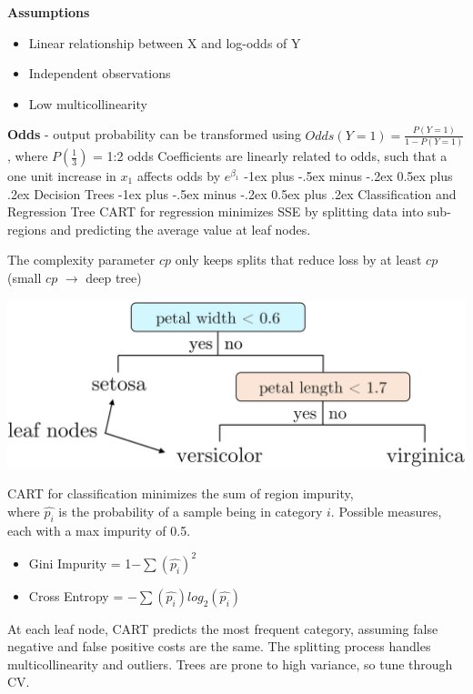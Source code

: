 \documentclass[10pt,landscape]{article}
\makeatletter
\renewcommand{\section}{\@startsection{section}{1}{0mm}%
                                {-1ex plus -.5ex minus -.2ex}%
                                {0.5ex plus .2ex}%
                                {\normalfont\large\bfseries}}
\renewcommand{\subsection}{\@startsection{subsection}{2}{0mm}%
                                {-1ex plus -.5ex minus -.2ex}%
                                {0.5ex plus .2ex}%
                                {\normalfont\normalsize\bfseries}}
\makeatother
\begin{document}
\begin{multicols}{3}
    \textbf{Assumptions}
    \begin{itemize}[label={--},leftmargin=4mm]
        \vspace{-1mm}
        \itemsep -.4mm
        \item Linear relationship between X and log-odds of Y
        \item Independent observations
        \item Low multicollinearity
    \end{itemize}
    \textbf{Odds} - output probability can be transformed using $Odds(Y = 1) = \frac{P(Y=1)}{1-P(Y=1)}$, where $P(\frac{1}{3})$ = 1:2 odds
    Coefficients are linearly related to odds, such that a one unit increase in $x_1$ affects odds by $e^{\beta_1}$
    \vspace{-.5mm}
    \section{Decision Trees}
    \subsection{Classification and Regression Tree}
    CART for regression minimizes SSE by splitting data into sub-regions and predicting the average value at leaf nodes.

    The complexity parameter $cp$ only keeps splits that reduce loss by at least $cp$ (small $cp$ $\to$ deep tree)
    \smallskip
    \begin{center}
        \vspace{-1mm}
        \includegraphics[scale = .08]{images/CART.JPG}
    \end{center}
    \vspace{-2mm}
    CART for classification minimizes the sum of region impurity, \\
    where $\hat{p_i}$ is the probability of a sample being in category $i$.
    Possible measures, each with a max impurity of 0.5.
    \begin{itemize}[label={--},leftmargin=4mm]
        \vspace{-1mm}
        \itemsep -.4mm
        \item Gini Impurity = 1$ - \sum (\hat{p_i})^2$
        \item Cross Entropy = $-\sum (\hat{p_i}) log_2(\hat{p_i})$
    \end{itemize}
    At each leaf node, CART predicts the most frequent category, assuming false negative and false positive costs are the same. The splitting process handles multicollinearity and outliers. Trees are prone to high variance, so tune through CV.
    

\end{multicols}
\end{document}
